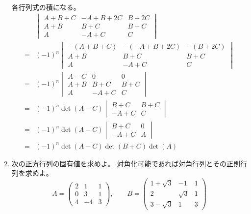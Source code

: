 \documentclass[12pt,b5paper]{ltjsarticle}
\begin{document}
\begin{enumerate}
      各行列式の積になる。
      \begin{align}
       & \begin{vmatrix}
        A+B+C & -A+B+2C & B+2C\\
        A+B & B+C & B+C\\
        A & -A+C & C
       \end{vmatrix}\\
       =&
       (-1)^n
       \begin{vmatrix}
        -(A+B+C) & -(-A+B+2C) & -(B+2C)\\
        A+B & B+C & B+C\\
        A & -A+C & C
       \end{vmatrix}\label{1st}\\
       =&
       (-1)^n
       \begin{vmatrix}
        A-C & 0 & 0\\
        A+B & B+C & B+C\\
        A & -A+C & C
       \end{vmatrix}\label{2nd}\\
       =&
       (-1)^n\det(A-C)
       \begin{vmatrix}
        B+C & B+C\\
        -A+C & C
       \end{vmatrix}\label{3rd}\\
       =&
       (-1)^n\det(A-C)
       \begin{vmatrix}
        B+C & 0\\
        -A+C & A
       \end{vmatrix}\label{4th}\\
       =&
       (-1)^n\det(A-C)\det(B+C)\det(A)
      \end{align}



      \hrulefill

 \item
      次の正方行列の固有値を求めよ。
      対角化可能であれば対角行列とその正則行列を求めよ。
      \begin{equation}
       A=
       \begin{pmatrix}
        2 & 1 & 1\\
        0 & 3 & 1\\
        4 & -4 & 3
       \end{pmatrix}
       ,\qquad
       B=
       \begin{pmatrix}
        1+\sqrt{3} & -1 & 1\\
        2 & \sqrt{3} & 1\\
        3-\sqrt{3} & 1 & 3
       \end{pmatrix}
      \end{equation}


\end{enumerate}
\end{document}
